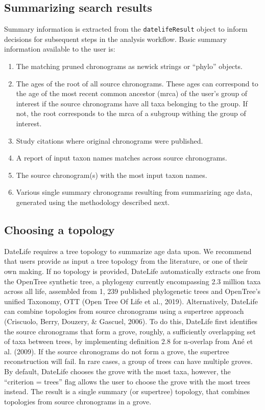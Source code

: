 \documentclass[english,man]{apa6}
\providecommand{\tightlist}{%
  \setlength{\itemsep}{0pt}\setlength{\parskip}{0pt}}
\begin{document}
\hypertarget{summarizing-search-results}{%
\subsection{Summarizing search results}\label{summarizing-search-results}}

Summary information is extracted from the \texttt{datelifeResult} object to inform decisions for subsequent steps in the analysis workflow. Basic summary information available to the user is:

\begin{enumerate}
\def\labelenumi{\arabic{enumi}.}
\tightlist
\item
  The matching pruned chronograms as newick strings or \enquote{phylo} objects.
\item
  The ages of the root of all source chronograms. These ages can correspond to the age of the most recent common ancestor (mrca) of the user's group of interest if the source chronograms have all taxa belonging to the group. If not, the root corresponds to the mrca of a subgroup withing the group of interest.
\item
  Study citations where original chronograms were published.
\item
  A report of input taxon names matches across source chronograms.
\item
  The source chronogram(s) with the most input taxon names.
\item
  Various single summary chronograms resulting from summarizing age data, generated using the methodology described next.
\end{enumerate}

\hypertarget{choosing-a-topology}{%
\subsection{Choosing a topology}\label{choosing-a-topology}}

DateLife requires a tree topology to summarize age data upon.
We recommend that users provide as input a tree topology from the literature, or one of their own making. If no topology is provided, DateLife automatically extracts one from the OpenTree synthetic tree, a phylogeny currently encompassing 2.3 million taxa across all life, assembled from 1, 239 published phylogenetic trees and OpenTree's unified Taxonomy, OTT (Open Tree Of Life et al., 2019).
Alternatively, DateLife can combine topologies from source chronograms using a supertree approach (Criscuolo, Berry, Douzery, \& Gascuel, 2006).
To do this, DateLife first identifies the source chronograms that form a grove, roughly, a sufficiently overlapping set of taxa between trees, by implementing definition 2.8 for n-overlap from Ané et al. (2009).
If the source chronograms do not form a grove, the supertree reconstruction will fail.
In rare cases, a group of trees can have multiple groves. By default, DateLife chooses the grove with the most taxa, however, the \enquote{criterion = trees} flag allows the user to choose the grove with the most trees instead.
The result is a single summary (or supertree) topology, that combines topologies from source chronograms in a grove.
\end{document}
